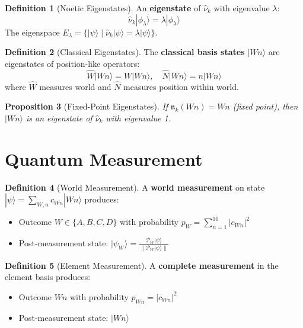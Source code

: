 \documentclass[11pt,twoside,openright]{book}
\theoremstyle{definition}
\newtheorem{definition}{Definition}[chapter]
\theoremstyle{plain}
\newtheorem{proposition}[definition]{Proposition}
\theoremstyle{remark}
\newcommand{\qket}[1]{|#1\rangle}
\newcommand{\qop}[1]{\hat{#1}}
\newcommand{\Projector}{\mathcal{P}}         %
\begin{document}
\begin{definition}[Noetic Eigenstates]
\label{def:noetic-eigenstates}
An \textbf{eigenstate} of $\qop{\nu}_k$ with eigenvalue $\lambda$:
\[
\qop{\nu}_k \qket{\phi_\lambda} = \lambda \qket{\phi_\lambda}
\]
The eigenspace $E_\lambda = \{\qket{\psi} \mid \qop{\nu}_k\qket{\psi} = \lambda\qket{\psi}\}$.
\end{definition}

\begin{definition}[Classical Eigenstates]
\label{def:classical-eigenstates}
The \textbf{classical basis states} $\qket{Wn}$ are eigenstates of position-like operators:
\[
\qop{W} \qket{Wn} = W \qket{Wn}, \quad \qop{N} \qket{Wn} = n \qket{Wn}
\]
where $\qop{W}$ measures world and $\qop{N}$ measures position within world.
\end{definition}

\begin{proposition}[Fixed-Point Eigenstates]
\label{prop:fixed-point-eigenstates}
If $\mathfrak{n}_k(Wn) = Wn$ (fixed point), then $\qket{Wn}$ is an eigenstate of $\qop{\nu}_k$ with eigenvalue 1.
\end{proposition}

\section{Quantum Measurement}

\begin{definition}[World Measurement]
\label{def:world-measurement}
A \textbf{world measurement} on state $\qket{\psi} = \sum_{W,n} c_{Wn}\qket{Wn}$ produces:
\begin{itemize}
  \item Outcome $W \in \{A, B, C, D\}$ with probability $p_W = \sum_{n=1}^{10} |c_{Wn}|^2$
  \item Post-measurement state: $\qket{\psi_W} = \frac{\Projector_W\qket{\psi}}{\|\Projector_W\qket{\psi}\|}$
\end{itemize}
\end{definition}

\begin{definition}[Element Measurement]
\label{def:element-measurement}
A \textbf{complete measurement} in the element basis produces:
\begin{itemize}
  \item Outcome $Wn$ with probability $p_{Wn} = |c_{Wn}|^2$
  \item Post-measurement state: $\qket{Wn}$
\end{itemize}
\end{definition}
\end{document}
